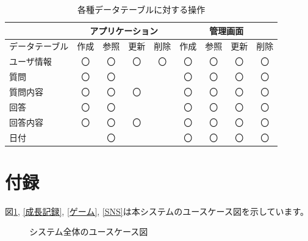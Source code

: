 \documentclass[a4j]{jarticle}
\begin{document}
\begin{table}[H]
    \caption{各種データテーブルに対する操作}
    \label{tbl: datatable}
    \begin{center}
        \begin{tabular}{|l||c|c|c|c||c|c|c|c|} \hline
             & \multicolumn{4}{|c||}{アプリケーション} & \multicolumn{4}{|c|}{管理画面}\\ \hline
            データテーブル & \multicolumn{1}{|l|}{作成} & \multicolumn{1}{|l|}{参照} & \multicolumn{1}{|l|}{更新} & \multicolumn{1}{|l||}{削除} & \multicolumn{1}{|l|}{作成} & \multicolumn{1}{|l|}{参照} & \multicolumn{1}{|l|}{更新} & \multicolumn{1}{|l|}{削除}\\ \hline \hline
            ユーザ情報 & 〇 & 〇 & 〇 & 〇 & 〇 & 〇 & 〇 & 〇\\ \hline
            質問 & 〇 & 〇 &  &  & 〇 & 〇 & 〇 & 〇\\ \hline
            質問内容 & 〇 & 〇 & 〇 &  & 〇 & 〇 & 〇 & 〇\\ \hline
            回答 & 〇 & 〇 &  &  & 〇 & 〇 & 〇 & 〇\\ \hline
            回答内容 & 〇 & 〇 & 〇 &  & 〇 & 〇 & 〇 & 〇\\ \hline
            日付 &  & 〇 &  &  & 〇 & 〇 & 〇 & 〇\\ \hline
        \end{tabular}
    \end{center}
\end{table}


\newpage
\appendix
\section{付録}
図\ref{全体}, \ref{成長記録}, \ref{ゲーム}, \ref{SNS}は本システムのユースケース図を示しています。

\begin{figure}[H]
  \begin{center}
    \caption{システム全体のユースケース図}
    \label{全体}
  \end{center}
\end{figure}
\end{document}
